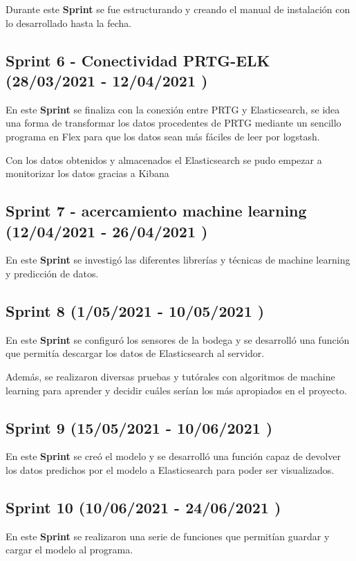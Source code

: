 Durante este \textbf{Sprint} se fue estructurando y creando el manual de instalación con lo desarrollado hasta la fecha.

\subsection{Sprint 6 - Conectividad PRTG-ELK (28/03/2021 - 12/04/2021 )}
En este \textbf{Sprint} se finaliza con la conexión entre PRTG y Elasticsearch, se idea una forma de transformar los datos procedentes de PRTG mediante un sencillo programa en Flex para que los datos sean más fáciles de leer por logstash.

Con los datos obtenidos y almacenados el Elasticsearch se pudo empezar a monitorizar los datos gracias a Kibana

\subsection{Sprint 7 - acercamiento machine learning  (12/04/2021 - 26/04/2021 )}
En este \textbf{Sprint} se investigó las diferentes librerías y técnicas  
de machine learning y predicción de datos.

\subsection{Sprint 8 (1/05/2021 - 10/05/2021 )}
En este \textbf{Sprint} se configuró los sensores de la bodega y se desarrolló una función que permitía descargar los datos de Elasticsearch al servidor.

Además, se realizaron diversas pruebas y tutórales con algoritmos de machine learning para aprender y decidir cuáles serían los más apropiados en el proyecto.

\subsection{Sprint 9   (15/05/2021 - 10/06/2021 )}

En este \textbf{Sprint} se creó el modelo y se desarrolló una función capaz de devolver los datos predichos por el modelo a Elasticsearch para poder ser visualizados.

\subsection{Sprint 10  (10/06/2021 - 24/06/2021 )}
En este \textbf{Sprint} se realizaron una serie de funciones que permitían guardar y cargar el modelo al programa.

